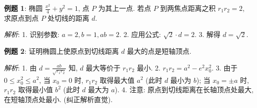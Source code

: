 \begin{examplebox}
\textbf{例题 1}: 椭圆 $\frac{x^2}{4} + y^2 = 1$, 点 $P$ 为其上一点. 若点 $P$ 到两焦点距离之积 $r_1r_2 = 2$, 求原点到点 $P$ 处切线的距离 $d$.

\textit{解析}: 
1. 识别参数: $a=2, b=1, ab=2$.
2. 应用公式: $\sqrt{2} \cdot d = 2$.
3. 解得 $d = \sqrt{2}$.

\textbf{例题 2}: 证明椭圆上使原点到切线距离 $d$ 最大的点是短轴顶点.

\textit{解析}:
1. 由 $d = \frac{ab}{\sqrt{r_1r_2}}$ 知, $d$ 最大等价于 $r_1r_2$ 最小.
2. $r_1r_2 = a^2 - e^2x_0^2$.
3. 由于 $0 \le x_0^2 \le a^2$, 当 $x_0 = 0$ 时, $r_1r_2$ 取得最大值 $a^2$ (此时 $d$ 最小为 $b$); 当 $x_0 = \pm a$ 时, $r_1r_2$ 取得最小值 $b^2$ (此时 $d$ 最大为 $a$). 
4. 注意: 原点到切线距离在长轴顶点处最大, 在短轴顶点处最小. (纠正解析直觉).
\end{examplebox}